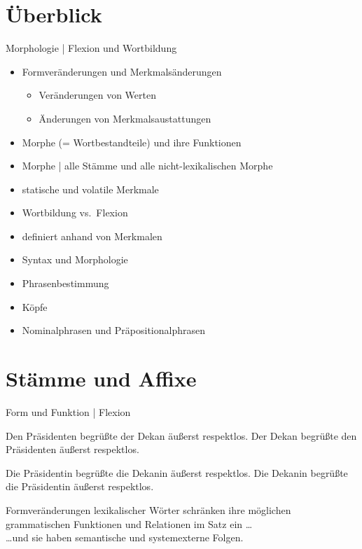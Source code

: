 \section{Überblick}

\begin{frame}
  {Morphologie | Flexion und Wortbildung}
  \pause
  \begin{itemize}[<+->]
    \item \alert{Formveränderungen} und \alert{Merkmalsänderungen}
      \begin{itemize}[<+->]
        \item Veränderungen von Werten
        \item Änderungen von Merkmalsaustattungen
      \end{itemize}
      \Halbzeile
    \item Morphe (= Wortbestandteile) und ihre Funktionen
    \item Morphe | alle Stämme und alle nicht-lexikalischen Morphe
      \Halbzeile
    \item statische und volatile Merkmale
    \item Wortbildung vs.\ Flexion
    \item definiert anhand von Merkmalen
      \Halbzeile
    \item Syntax und Morphologie
    \item Phrasenbestimmung
    \item Köpfe
    \item Nominalphrasen und Präpositionalphrasen
  \end{itemize}
\end{frame}


\section{Stämme und Affixe}

\begin{frame}
  {Form und Funktion | Flexion}
  \pause
  \begin{exe}
    \ex
    \begin{xlist}
      \ex \alert{Den Präsidenten} begrüßte \alert{der Dekan} äußerst respektlos.
      \pause
      \ex \alert{Der Dekan} begrüßte \alert{den Präsidenten} äußerst respektlos.
    \end{xlist}
    \pause
    \ex
    \begin{xlist}
      \ex \alert{Die Präsidentin} begrüßte \alert{die Dekanin} äußerst respektlos.
      \pause
      \ex \alert{Die Dekanin} begrüßte \alert{die Präsidentin} äußerst respektlos.
    \end{xlist}
  \end{exe}
  \pause
  \Zeile
  Formveränderungen lexikalischer Wörter \alert{schränken ihre möglichen grammatischen Funktionen und Relationen im Satz ein} \dots\\
  \pause
  \Halbzeile
  \dots und sie haben semantische und systemexterne Folgen.

\end{frame}

